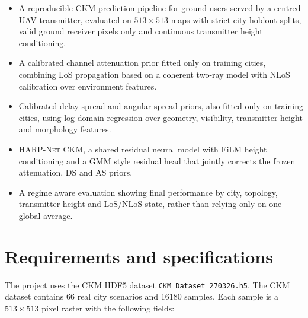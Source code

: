 \begin{itemize}
  \item A reproducible CKM prediction pipeline for ground users served by a
        centred UAV transmitter, evaluated on \(513\times513\) maps with strict
        city holdout splits, valid ground receiver pixels only and continuous
        transmitter height conditioning.
  \item A calibrated channel attenuation prior fitted only on training cities,
        combining LoS propagation based on a coherent two-ray model with NLoS
        calibration over environment features.
  \item Calibrated delay spread and angular spread priors, also fitted only on
        training cities, using log domain regression over geometry, visibility,
        transmitter height and morphology features.
  \item \textsc{HARP-Net CKM}, a shared residual neural model with FiLM height
        conditioning and a GMM style residual head that jointly corrects the
        frozen attenuation, DS and AS priors.
  \item A regime aware evaluation showing final performance by city, topology,
        transmitter height and LoS/NLoS state, rather than relying only on one
        global average.
\end{itemize}

\section{Requirements and specifications}

The project uses the CKM HDF5 dataset
\texttt{CKM\_Dataset\_270326.h5}. The CKM dataset contains 66 real city
scenarios and 16180 samples. Each sample is a $513\times513$ pixel raster with
the following fields:

